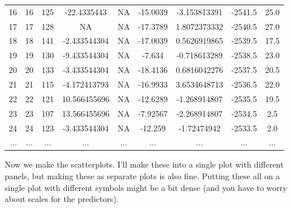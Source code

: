 \documentclass[
  letterpaper,
  DIV=11,
  numbers=noendperiod]{scrartcl}
\begin{document}
\begin{tabular}{r|cccccccc}
    16 & 16 & 125 & -22.4335443 & NA & -15.0039 & -3.153813391 & -2541.5 & 25.0 \\
    17 & 17 & 128 & NA & NA & -17.3789 & 1.8072373332 & -2540.5 & 27.0 \\
    18 & 18 & 141 & -2.433544304 & NA & -17.0039 & 0.5626919865 & -2539.5 & 17.5 \\
    19 & 19 & 130 & -9.433544304 & NA & -7.634 & -0.718613289 & -2538.5 & 23.0 \\
    20 & 20 & 133 & -3.433544304 & NA & -18.4136 & 0.6816042276 & -2537.5 & 20.5 \\
    21 & 21 & 115 & -4.172413793 & NA & -16.9933 & 3.6534648713 & -2536.5 & 22.0 \\
    22 & 22 & 121 & 10.566455696 & NA & -12.6289 & -1.268914807 & -2535.5 & 19.5 \\
    23 & 23 & 107 & 13.566455696 & NA & -7.92567 & -2.268914807 & -2534.5 & 2.5 \\
    24 & 24 & 123 & -3.433544304 & NA & -12.259 & -1.72474942 & -2533.5 & 2.0 \\
    $\dots$ & $\dots$ & $\dots$ & $\dots$ & $\dots$ & $\dots$ & $\dots$ & $\dots$ & $\dots$ \\
\end{tabular}

Now we make the scatterplots. I'll make these into a single plot with
different panels, but making these as separate plots is also fine.
Putting these all on a single plot with different symbols might be a bit
dense (and you have to worry about scales for the predictors).
\end{document}
